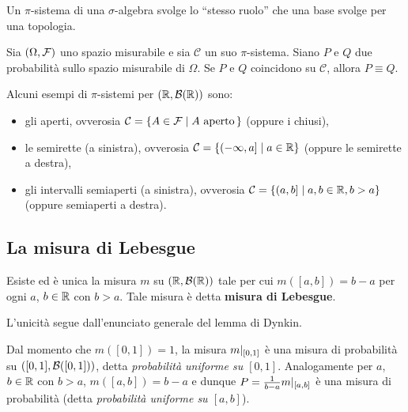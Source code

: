 \begin{multicols*}{2}
\begin{remark}
    Un $\pi$-sistema di una $\sigma$-algebra svolge lo ``stesso ruolo'' che una
    base svolge per una topologia.
\end{remark}

\begin{lemma}
    Sia $(\Omega, \mathcal{F})$ uno spazio misurabile e sia $\mathcal{C}$ un suo $\pi$-sistema. Siano
    $P$ e $Q$ due probabilità sullo spazio misurabile di $\Omega$. Se $P$ e $Q$ coincidono su
    $\mathcal{C}$, allora $P \equiv Q$.
\end{lemma}

\begin{example}
    Alcuni esempi di $\pi$-sistemi per $(\mathbb{R}, \mathcal{B}(\mathbb{R}))$ sono:
    \begin{itemize}
        \item gli aperti, ovverosia $\mathcal{C} = \{ A \in \mathcal{F} \mid A \text{ aperto}\, \}$ (oppure i chiusi),
        \item le semirette (a sinistra), ovverosia $\mathcal{C} = \{ (-\infty, a] \mid a \in \mathbb{R} \}$ (oppure le semirette a destra),
        \item gli intervalli semiaperti (a sinistra), ovverosia $\mathcal{C} = \{ (a, b] \mid a, b \in \mathbb{R}, b > a \}$ (oppure semiaperti a destra).
    \end{itemize}
\end{example}

\subsection{La misura di Lebesgue}

\begin{theorem}
    Esiste ed è unica la misura $m$ su $(\mathbb{R}, \mathcal{B}(\mathbb{R}))$ tale per cui
    $m([a, b]) = b-a$ per ogni $a$, $b \in \mathbb{R}$ con $b > a$. Tale misura
    è detta \textbf{misura di Lebesgue}. \smallskip


    L'unicità segue dall'enunciato generale del lemma di Dynkin.
\end{theorem}

\begin{remark}
    Dal momento che $m([0, 1]) = 1$,
    la misura $m\arrowvert_{[0,1]}$ è una misura di probabilità su $([0,1], \mathcal{B}([0, 1]))$,
    detta \textit{probabilità uniforme su $[0,1]$}. Analogamente per $a$, $b \in \mathbb{R}$
    con $b > a$, $m([a, b]) = b-a$ e
    dunque $P = \frac{1}{b-a} m\arrowvert_{[a,b]}$ è una misura di probabilità (detta
    \textit{probabilità uniforme su $[a,b]$}). \smallskip



\end{remark}
\end{multicols*}
